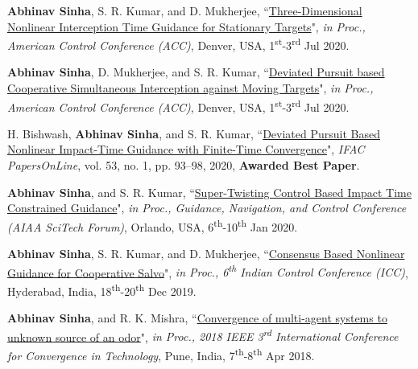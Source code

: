 {\begin{etaremune}[leftmargin=1cm]
		\item \textbf{Abhinav Sinha}, S. R. Kumar, and D. Mukherjee, ``\href{https://ieeexplore.ieee.org/abstract/document/9147854}{Three-Dimensional Nonlinear Interception Time Guidance for Stationary Targets}", \emph{in Proc., American Control Conference (ACC)}, Denver, USA, 1\textsuperscript{st}-3\textsuperscript{rd} Jul 2020.
		\item \textbf{Abhinav Sinha}, D. Mukherjee, and S. R. Kumar, ``\href{https://ieeexplore.ieee.org/abstract/document/9147677}{Deviated Pursuit based Cooperative Simultaneous Interception against Moving Targets}", \emph{in Proc., American Control Conference (ACC)}, Denver, USA, 1\textsuperscript{st}-3\textsuperscript{rd} Jul 2020.
		\item H. Bishwash, \textbf{Abhinav Sinha}, and S. R. Kumar, ``\href{https://www.sciencedirect.com/science/article/pii/S2405896320300343}{Deviated Pursuit Based Nonlinear Impact-Time Guidance with Finite-Time Convergence}", \emph{IFAC PapersOnLine}, vol. 53, no. 1, pp. 93--98, 2020, \textbf{Awarded Best Paper}.
		\item \textbf{Abhinav Sinha}, and S. R. Kumar, ``\href{https://arc.aiaa.org/doi/abs/10.2514/6.2020-0610}{Super-Twisting Control Based Impact Time Constrained Guidance}", \emph{in Proc., Guidance, Navigation, and Control Conference (AIAA SciTech Forum)}, Orlando, USA, 6\textsuperscript{th}-10\textsuperscript{th} Jan 2020.
		\item \textbf{Abhinav Sinha}, S. R. Kumar, and D. Mukherjee, ``\href{https://ieeexplore.ieee.org/abstract/document/9123223/}{Consensus Based Nonlinear Guidance for Cooperative Salvo}", \emph{in Proc., 6\textsuperscript{th} Indian Control Conference (ICC)}, Hyderabad, India, 18\textsuperscript{th}-20\textsuperscript{th} Dec 2019.
		\item \textbf{Abhinav Sinha}, and R. K. Mishra, ``\href{https://ieeexplore.ieee.org/document/8529713}{Convergence of multi-agent systems to unknown source of an odor}", \emph{in Proc., 2018 IEEE 3\textsuperscript{rd} International Conference for Convergence in Technology}, Pune, India, 7\textsuperscript{th}-8\textsuperscript{th} Apr 2018.

\end{etaremune}}
